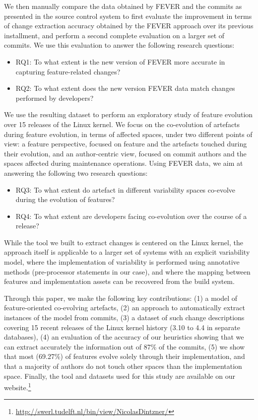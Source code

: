We then manually compare the data obtained by FEVER and the commits as presented in the source control system
to first evaluate the improvement in terms of change extraction accuracy obtained by the FEVER approach over its previous installment,
and perform a second complete evaluation on a larger set of commits. We use this evaluation to answer the following research questions:
\begin{itemize}
\item RQ1: To what extent is the new version of FEVER more accurate in capturing feature-related changes?
\item RQ2: To what extent does the new version FEVER data match changes performed by developers?
\end{itemize}

We use the resulting dataset to perform an exploratory study of feature evolution over 15 releases of the Linux kernel.
We focus on the co-evolution of artefacts during feature evolution, in terms of affected spaces, under two different points of view: a feature perspective, focused on feature and the artefacts touched during their evolution, and an author-centric view, focused on commit authors and the spaces affected during maintenance operations.
Using FEVER data, we aim at answering the following two research questions:
\begin{itemize}
\item RQ3: To what extent do artefact in different variability spaces co-evolve during the evolution of features?
\item RQ4: To what extent are developers facing co-evolution over the course of a release?
\end{itemize}

While the tool we built to extract changes is centered on the Linux kernel, the approach itself is applicable to a larger set of systems \citep{berger_survey_2013,hunsen_preprocessor-based_2015}
with an explicit variability model, where the implementation of variability is performed using annotative methods (pre-processor statements in our case), 
and where the mapping between features and implementation assets can be recovered from the build system.

Through this paper, we make the following key contributions:
(1) a model of feature-oriented co-evolving artefacts,
(2) an approach to automatically extract instances of the model from commits,
(3) a dataset of such change descriptions covering 15 recent releases of the Linux kernel history (3.10 to 4.4 in separate databases),
(4) an evaluation of the accuracy of our heuristics showing that we can extract accurately the information out of 87\% of the commits,
(5) we show that most (69.27\%) of features evolve solely through their implementation, and that a majority of authors do not touch other spaces than the implementation space.
Finally, the tool and datasets used for this study are available on our website.\footnote{\url{http://swerl.tudelft.nl/bin/view/NicolasDintzner/}}

